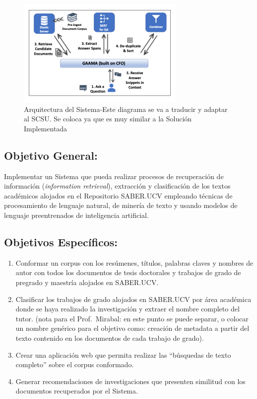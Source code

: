 \documentclass[
  10,
  openany]{book}
\begin{document}
\begin{figure}

{\centering \includegraphics[width=0.6\linewidth]{images/02-problema/arquitectura_sri} 

}

\caption{Arquitectura del Sistema-Este diagrama se va a traducir y adaptar al SCSU. Se coloca ya que es muy similar a la Solución Implementada}\label{fig:arquitecturasri}
\end{figure}

\hypertarget{objegeneral}{%
\subsection{Objetivo General:}\label{objegeneral}}

Implementar un Sistema que pueda realizar procesos de recuperación de información (\emph{information retrieval}), extracción y clasificación de los textos académicos alojados en el Repositorio SABER.UCV empleando técnicas de procesamiento de lenguaje natural, de minería de texto y usando modelos de lenguaje preentrenados de inteligencia artificial.

\hypertarget{objeespe}{%
\subsection{Objetivos Específicos:}\label{objeespe}}

\begin{enumerate}
\def\labelenumi{\arabic{enumi}.}
\item
  Conformar un corpus con los resúmenes, títulos, palabras claves y nombres de autor con todos los documentos de tesis doctorales y trabajos de grado de pregrado y maestría alojados en SABER.UCV.
\item
  Clasificar los trabajos de grado alojados en SABER.UCV por área académica donde se haya realizado la investigación y extraer el nombre completo del tutor. (nota para el Prof.~Mirabal: en este punto se puede separar, o colocar un nombre genérico para el objetivo como: creación de metadata a partir del texto contenido en los documentos de cada trabajo de grado).
\item
  Crear una aplicación web que permita realizar las ``búsquedas de texto completo'' sobre el corpus conformado.
\item
  Generar recomendaciones de investigaciones que presenten similitud con los documentos recuperados por el Sistema.
\end{enumerate}
\end{document}

